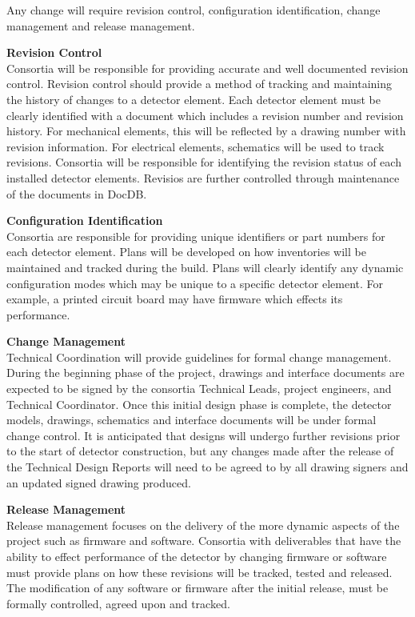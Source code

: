 Any change will require revision control, configuration
identification, change management and release management.

{\bf Revision Control}\\ Consortia will be responsible for providing
accurate and well documented revision control.  Revision control
should provide a method of tracking and maintaining the history of
changes to a detector element.  Each detector element must be clearly
identified with a document which includes a revision number and
revision history.  For mechanical elements, this will be reflected by
a drawing number with revision information.  For electrical elements,
schematics will be used to track revisions.  Consortia will be
responsible for identifying the revision status of each installed
detector elements. Revisios are further controlled through maintenance
of the documents in DocDB.

{\bf Configuration Identification}\\
Consortia are responsible for providing unique identifiers or part
numbers for each detector element.  Plans will be developed on how
inventories will be maintained and tracked during the build.  Plans
will clearly identify any dynamic configuration modes which may be
unique to a specific detector element.  For example, a printed circuit
board may have firmware which effects its performance.

{\bf Change Management}\\
Technical Coordination will provide guidelines
for formal change management.  During the beginning phase of the
project, drawings and interface documents are expected to be signed by
the consortia Technical Leads, project engineers, and Technical
Coordinator.  Once this initial design phase is complete, the detector
models, drawings, schematics and interface documents will be under
formal change control.  It is anticipated that designs will undergo
further revisions prior to the start of detector construction, but any
changes made after the release of the Technical Design Reports will
need to be agreed to by all drawing signers and an updated signed
drawing produced.

{\bf Release Management}\\
Release management focuses on the delivery of the more dynamic aspects
of the project such as firmware and software.  Consortia with
deliverables that have the ability to effect performance of the
detector by changing firmware or software must provide plans on how
these revisions will be tracked, tested and released.  The
modification of any software or firmware after the initial release,
must be formally controlled, agreed upon and tracked.


